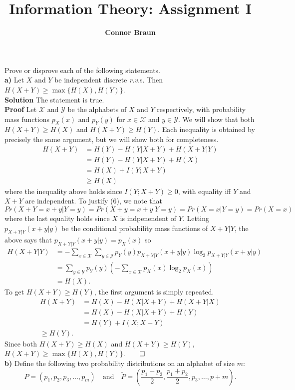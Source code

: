 \documentclass[11pt, letterpaper]{article}
\title{\bf Information Theory: Assignment I}
\author{\bf Connor Braun}
\date{}
\newcommand{\mc}[1]{\mathcal{#1}}
\begin{document}
\maketitle
{} Prove or disprove each of the following statements.\\[10pt]
{\bf a)} Let $X$ and $Y$ be independent discrete {\it r.v.}s. Then $H(X+Y)\geq\max\{H(X),H(Y)\}$.\\[10pt]
{\bf Solution} The statement is true.\\[10pt]
{\bf Proof} Let $\mc{X}$ and $\mc{Y}$ be the alphabets of $X$ and $Y$ respectively, with probability mass functions $p_X(x)$ and $p_Y(y)$ for $x\in\mc{X}$ and $y\in\mc{Y}$.
We will show that both $H(X+Y)\geq H(X)$ and $H(X+Y)\geq H(Y)$. Each inequality is obtained by precisely the same argument, but we will show both
for completeness.
\begin{align*}
    H(X+Y)&=H(Y)-H(Y|X+Y)+H(X+Y|Y)\\
    &=H(Y)-H(Y|X+Y)+H(X)\tag{6}\\
    &=H(X)+I(Y;X+Y)\\
    &\geq H(X)
\end{align*}
where the inequality above holds since $I(Y;X+Y)\geq 0$, with equality iff $Y$ and $X+Y$ are independent. To justify (6), we note that
\[Pr(X+Y=x+y|Y=y)=Pr(X+y=x+y|Y=y)=Pr(X=x|Y=y)=Pr(X=x)\]
where the last equality holds since $X$ is indpenendent of $Y$. Letting $p_{X+Y|Y}(x+y|y)$ be the conditional probability mass functions of $X+Y|Y$,
the above says that $p_{X+Y|Y}(x+y|y)=p_X(x)$ so
\begin{align*}
    H(X+Y|Y)&=-\sum_{x\in\mc{X}}\sum_{y\in\mc{Y}}p_Y(y)p_{X+Y|Y}(x+y|y)\log_2p_{X+Y|Y}(x+y|y)\\
    &=\sum_{y\in\mc{Y}}p_Y(y)\left(-\sum_{x\in\mc{X}}p_X(x)\log_2p_X(x)\right)\\
    &=H(X).
\end{align*}
To get $H(X+Y)\geq H(Y)$, the first argument is simply repeated.
\begin{align*}
    H(X+Y)&=H(X)-H(X|X+Y)+H(X+Y|X)\\
    &=H(X)-H(X|X+Y)+H(Y)\\
    &=H(Y)+I(X;X+Y)\\
    \geq H(Y).
\end{align*}
Since both $H(X+Y)\geq H(X)$ and $H(X+Y)\geq H(Y)$, $H(X+Y)\geq\max\{H(X),H(Y)\}$.\hfill{$\qed$}\\[10pt]
{\bf b)} Define the following two probability distributions on an alphabet of size $m$:
\[P=(p_1,p_2,p_3,\dots,p_m)\quad\text{and}\quad \tilde{P}=\left(\frac{p_1+p_2}{2},\frac{p_1+p_2}{2},p_3,\dots,p+m\right).\]
\end{document}
